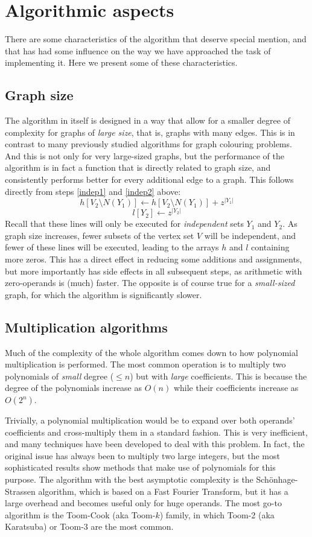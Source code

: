 \documentclass{cslthse-msc}
\begin{document}
\section{Algorithmic aspects}
There are some characteristics of the algorithm that deserve special mention, and that has had some influence on the way we have approached the task of implementing it. Here we present some of these characteristics.

\subsection{Graph size}\label{graphdensity}
The algorithm in itself is designed in a way that allow for a smaller degree of complexity for graphs of \emph{large size}, that is, graphs with many edges. This is in contrast to many previously studied algorithms for graph colouring problems. And this is not only for very large-sized graphs, but the performance of the algorithm is in fact a function that is directly related to graph size, and consistently performs better for every additional edge to a graph. This follows directly from steps \ref{indep1} and \ref{indep2} above:
\[ h[V_2 \setminus N(Y_1)] \leftarrow h[V_2 \setminus N(Y_1)] + z^{|Y_1|} \]
\[ l[Y_2] \leftarrow z^{|Y_2|} \]
Recall that these lines will only be executed for \emph{independent} sets $Y_1$ and $Y_2$. As graph size increases, fewer subsets of the vertex set $V$ will be independent, and fewer of these lines will be executed, leading to the arrays $h$ and $l$ containing more zeros. This has a direct effect in reducing some additions and assignments, but more importantly has side effects in all subsequent steps, as arithmetic with zero-operands is (much) faster. The opposite is of course true for a \emph{small-sized} graph, for which the algorithm is significantly slower.

\subsection{Multiplication algorithms}
Much of the complexity of the whole algorithm comes down to how polynomial multiplication is performed. The most common operation is to multiply two polynomials of \emph{small} degree ($\leq n$) but with \emph{large} coefficients. This is because the degree of the polynomials increase as $O(n)$ while their coefficients increase as $O(2^n)$.

Trivially, a polynomial multiplication would be to expand over both operands' coefficients and cross-multiply them in a standard fashion. This is very inefficient, and many techniques have been developed to deal with this problem. In fact, the original issue has always been to multiply two large integers, but the most sophisticated results show methods that make use of polynomials for this purpose. The algorithm with the best asymptotic complexity is the Schönhage-Strassen algorithm, which is based on a Fast Fourier Transform, but it has a large overhead and becomes useful only for huge operands. The most go-to algorithm is the Toom-Cook (aka Toom-$k$) family, in which Toom-2 (aka Karatsuba) or Toom-3 are the most common.
\end{document}
